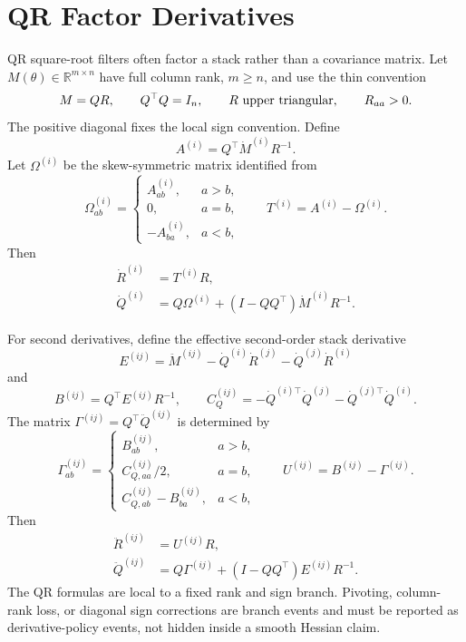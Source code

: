 \section{QR Factor Derivatives}
\label{sec:bf-factor-qr}

QR square-root filters often factor a stack rather than a covariance matrix.  Let
$M(\theta)\in\mathbb{R}^{m\times n}$ have full column rank, $m\ge n$, and use
the thin convention
\[
  M=QR,\qquad Q^\top Q=I_n,\qquad R\ \hbox{upper triangular},\qquad R_{aa}>0.
\]
The positive diagonal fixes the local sign convention.  Define
\[
  A^{(i)} = Q^\top\dot M^{(i)}R^{-1}.
\]
Let $\Omega^{(i)}$ be the skew-symmetric matrix identified from
\[
  \Omega^{(i)}_{ab}=
  \begin{cases}
    A^{(i)}_{ab}, & a>b,\\
    0, & a=b,\\
    -A^{(i)}_{ba}, & a<b,
  \end{cases}
  \qquad
  T^{(i)}=A^{(i)}-\Omega^{(i)} .
\]
Then
\begin{align}
\label{eq:bf-factor-qr-r-first}
  \dot R^{(i)} &= T^{(i)}R,\\
\label{eq:bf-factor-qr-q-first}
  \dot Q^{(i)} &= Q\Omega^{(i)}+(I-QQ^\top)\dot M^{(i)}R^{-1}.
\end{align}

For second derivatives, define the effective second-order stack derivative
\[
  E^{(ij)}
  =
  \ddot M^{(ij)}
  -\dot Q^{(i)}\dot R^{(j)}
  -\dot Q^{(j)}\dot R^{(i)}
\]
and
\[
  B^{(ij)}=Q^\top E^{(ij)}R^{-1},\qquad
  C_Q^{(ij)}
  =
  -\dot Q^{(i)\top}\dot Q^{(j)}
  -\dot Q^{(j)\top}\dot Q^{(i)}.
\]
The matrix $\Gamma^{(ij)}=Q^\top\ddot Q^{(ij)}$ is determined by
\[
  \Gamma^{(ij)}_{ab}=
  \begin{cases}
    B^{(ij)}_{ab}, & a>b,\\
    C_{Q,aa}^{(ij)}/2, & a=b,\\
    C_{Q,ab}^{(ij)}-B^{(ij)}_{ba}, & a<b,
  \end{cases}
  \qquad
  U^{(ij)}=B^{(ij)}-\Gamma^{(ij)}.
\]
Then
\begin{align}
\label{eq:bf-factor-qr-r-second}
  \ddot R^{(ij)} &= U^{(ij)}R,\\
\label{eq:bf-factor-qr-q-second}
  \ddot Q^{(ij)} &= Q\Gamma^{(ij)}+(I-QQ^\top)E^{(ij)}R^{-1}.
\end{align}
The QR formulas are local to a fixed rank and sign branch.  Pivoting,
column-rank loss, or diagonal sign corrections are branch events and must be
reported as derivative-policy events, not hidden inside a smooth Hessian claim.


